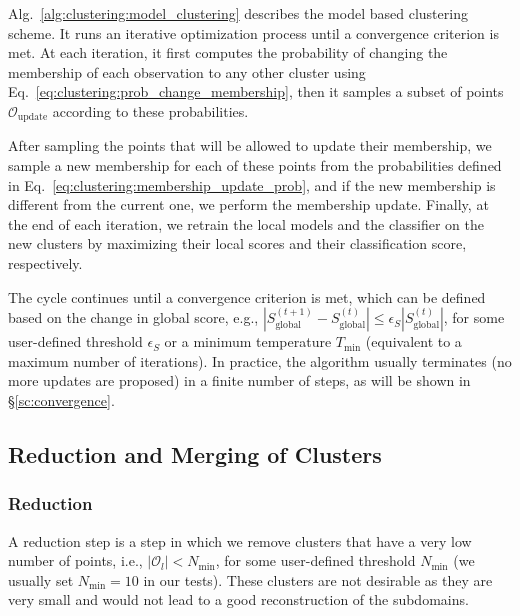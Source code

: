Alg.~\ref{alg:clustering:model_clustering} describes the model based clustering scheme. It runs an iterative optimization process until a convergence criterion is met. At each iteration, it first computes the probability of changing the membership of each observation to any other cluster using Eq.~\eqref{eq:clustering:prob_change_membership}, then it samples a subset of points $\mathcal{O}_{\mathrm{update}}$ according to these probabilities.

\smallskip
After sampling the points that will be allowed to update their membership, we sample a new membership for each of these points from the probabilities defined in Eq.~\eqref{eq:clustering:membership_update_prob}, and if the new membership is different from the current one, we perform the membership update. Finally, at the end of each iteration, we retrain the local models and the classifier on the new clusters by maximizing their local scores and their classification score, respectively.

\smallskip
The cycle continues until a convergence criterion is met, which can be defined based on the change in global score, e.g., $|S_{\mathrm{global}}^{(t+1)} - S_{\mathrm{global}}^{(t)}| \leq \epsilon_S |S_{\mathrm{global}}^{(t)}|$, for some user-defined threshold $\epsilon_S$ or a minimum temperature $T_{\min}$ (equivalent to a maximum number of iterations). In practice, the algorithm usually terminates (no more updates are proposed) in a finite number of steps, as will be shown in \S\ref{sc:convergence}.

\subsection{Reduction and Merging of Clusters}
\label{sec:clustering:mb:reduction_merging}



\subsubsection{Reduction}
A reduction step is a step in which we remove clusters that have a very low number of points, i.e., $|\mathcal{O}_l| < N_{\min}$, for some user-defined threshold $N_{\min}$ (we usually set $N_{\min} = 10$ in our tests). These clusters are not desirable as they are very small and would not lead to a good reconstruction of the subdomains. 

